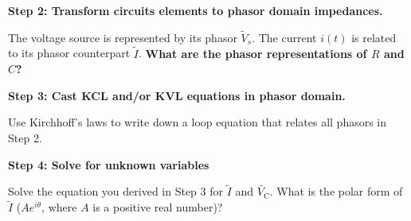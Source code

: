 \begin{enumerate}

\qitem \textbf{Step 2: Transform circuits elements to phasor domain impedances.}

The voltage source is represented by its phasor $\widetilde{V}_s$.
The current $i(t)$ is related to its phasor counterpart $\widetilde{I}$. 
\textbf{What are the phasor representations of $R$ and $C$?}


\ws{\vspace{50px}}



\qitem \textbf{Step 3: Cast KCL and/or KVL equations in phasor domain.}

Use Kirchhoff's laws to write down a loop equation that relates all phasors in Step 2.

\ws{\vspace{100px}}


\qitem \textbf{Step 4: Solve for unknown variables}

Solve the equation you derived in Step 3 for $\widetilde{I}$ and $\widetilde{V_{\text{C}}}$.
What is the polar form of $\widetilde{I}$ ($Ae^{i\theta}$, where $A$ is a positive real number)? 


\end{enumerate}
